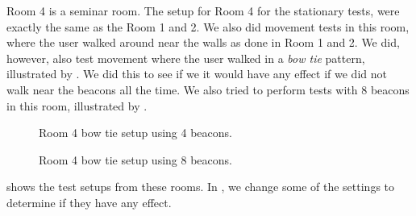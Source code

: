 Room 4 is a seminar room. 
The setup for Room 4 for the stationary tests,
were exactly the same as the Room 1 and 2. 
We also did movement tests in this room, 
where the user walked around near the walls as done in Room 1 and 2. 
We did, however, also test movement where the user walked in a \emph{bow tie} pattern,
illustrated by . 
We did this to see if we it would have any effect if we did not walk near the beacons all the time. 
We also tried to perform tests with \num{8} beacons in this room, 
illustrated by . 

\begin{figure}[!htb]
  \begin{minipage}[b]{0.45\textwidth}
    \centering
    
    \caption{Room 4 bow tie setup using \num{4} beacons.}
    \label{fig:bowtie4beacons}
  \end{minipage}\hfill
  \begin{minipage}[b]{0.45\textwidth}
    \centering
    
    \caption{Room 4 bow tie setup using \num{8} beacons.}
    \label{fig:bowtie8beacons}
  \end{minipage}
\end{figure}

 shows the test setups from these rooms.
In , we change some of the settings to determine if they have any effect.

